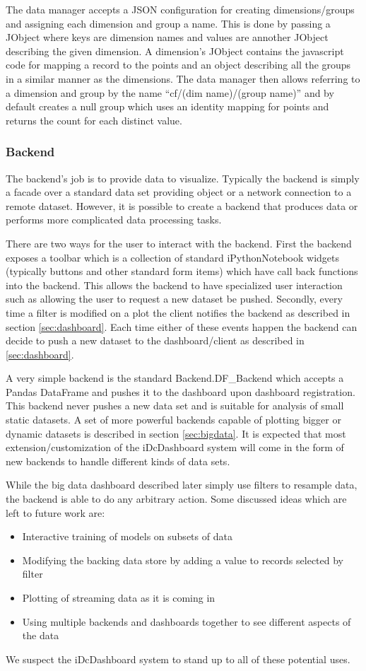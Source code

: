 \documentclass[letter,twocolumn]{article}
\begin{document}
The data manager accepts a JSON configuration for creating dimensions/groups and assigning each dimension and group a name.  
This is done by passing a JObject where keys are dimension names and values are annother JObject describing the given dimension.
A dimension's JObject contains the javascript code for mapping a record to the points and an object describing all the groups in a similar manner as the dimensions.
The data manager then allows referring to a dimension and group by the name ``cf/(dim name)/(group name)'' and by default creates a null group which uses an identity mapping for points and returns the count for each distinct value.

\subsubsection{Backend}\label{sec:backend}

The backend's job is to provide data to visualize.
Typically the backend is simply a facade over a standard data set providing object or a network connection to a remote dataset.  
However, it is possible to create a backend that produces data or performs more complicated data processing tasks.

There are two ways for the user to interact with the backend.
First the backend exposes a toolbar which is a collection of standard iPythonNotebook widgets (typically buttons and other standard form items) which have call back functions into the backend.
This allows the backend to have specialized user interaction such as allowing the user to request a new dataset be pushed.
Secondly, every time a filter is modified on a plot the client notifies the backend as described in section \ref{sec:dashboard}.
Each time either of these events happen the backend can decide to push a new dataset to the dashboard/client as described in \ref{sec:dashboard}.

A very simple backend is the standard Backend.DF\_Backend which accepts a Pandas DataFrame and pushes it to the dashboard upon dashboard registration.
This backend never pushes a new data set and is suitable for analysis of small static datasets.
A set of more powerful backends capable of plotting bigger or dynamic datasets is described in section \ref{sec:bigdata}.
It is expected that most extension/customization of the iDcDashboard system will come in the form of new backends to handle different kinds of data sets.

While the big data dashboard described later simply use filters to resample data, the backend is able to do any arbitrary action.  Some discussed ideas which are left to future work are:
\begin{itemize}
	\item Interactive training of models on subsets of data
	\item Modifying the backing data store by adding a value to records selected by filter
	\item Plotting of streaming data as it is coming in
	\item Using multiple backends and dashboards together to see different aspects of the data
\end{itemize}
We suspect the iDcDashboard system to stand up to all of these potential uses.
\end{document}
